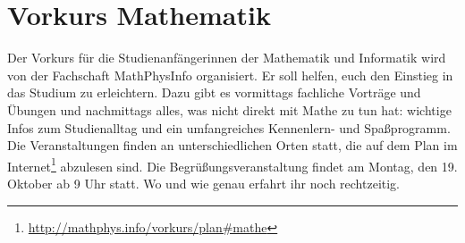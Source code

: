 \section{Vorkurs Mathematik}
Der Vorkurs für die Studienanfängerinnen der Mathematik und Informatik wird von der Fachschaft MathPhysInfo organisiert. Er soll helfen, euch den Einstieg in das Studium zu erleichtern. Dazu gibt es vormittags fachliche Vorträge und Übungen und nachmittags alles, was nicht direkt mit Mathe zu tun hat: wichtige Infos zum Studienalltag und ein umfangreiches Kennenlern- und Spaßprogramm.
Die Veranstaltungen finden an unterschiedlichen Orten statt, die auf dem Plan im Internet\footnote{\url{http://mathphys.info/vorkurs/plan\#mathe}} abzulesen sind. Die Begrüßungsveranstaltung findet am Montag, den 19. Oktober ab 9 Uhr statt. Wo und wie genau erfahrt ihr noch rechtzeitig.
